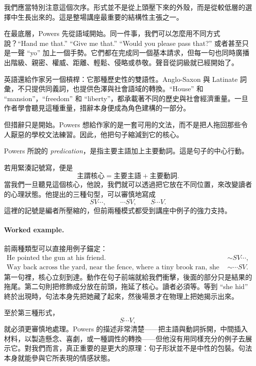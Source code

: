 我們應當特別注意這個次序。形式並不是從上頭壓下來的外殼，而是從較低層的選擇中生長出來的。這是整場講座最重要的結構性主張之一。

在最底層，Powers 先從語域開始。同一件事，我們可以怎麼用不同方式說？``Hand me that.'' ``Give me that.'' ``Would you please pass that?'' 或者甚至只是一聲 ``yo'' 加上一個手勢。它們都在完成同一個基本請求，但每一句也同時廣播出階級、親密、權威、距離、輕鬆、侵略或恭敬。聲音從詞級就已經開始了。

英語還給作家另一個槓桿：它那種歷史性的雙語性。Anglo-Saxon 與 Latinate 詞彙，不只提供同義詞，也提供色澤與社會語域的轉換。``House'' 和 ``mansion''，``freedom'' 和 ``liberty''，都承載著不同的歷史與社會經濟重量。一旦作者學會聽見這種重量，措辭本身便成為角色建構的一部分。

但措辭只是開始。Powers 想給作家的是一套可用的文法，而不是把人拖回那些令人厭惡的學校文法練習。因此，他把句子縮減到它的核心。

\begin{definition}
Powers 所說的 \emph{predication}，是指主要主語加上主要動詞。這是句子的中心行動。
\end{definition}

若用緊湊記號寫，便是
\begin{equation}
\text{主謂核心} = \text{主要主語} + \text{主要動詞}.
\end{equation}
當我們一旦聽見這個核心，他說，我們就可以透過把它放在不同位置，來改變讀者的心理狀態。他提出的三種句型，可以審慎地寫成
\begin{equation}
SV\cdots,\qquad \cdots SV,\qquad S\cdots V.
\end{equation}
這裡的記號是編者所壓縮的，但前兩種模式都受到講座中例子的強力支持。

\paragraph{Worked example.} 前兩種類型可以直接用例子錨定：
\begin{align}
\text{He pointed the gun at his friend.} &\sim SV\cdots,\\
\text{Way back across the yard, near the fence, where a tiny brook ran, she hid.} &\sim \cdots SV.
\end{align}
第一句裡，核心立刻到達。動作在句子前端就給我們衝擊，後面的部分只是結果的拖尾。第二句則把修飾成分放在前頭，拖延了核心。讀者必須等。等到 ``she hid'' 終於出現時，句法本身先把她藏了起來，然後場景才在物理上把她揭示出來。

至於第三種形式，
\[
S\cdots V,
\]
就必須更審慎地處理。Powers 的描述非常清楚——把主語與動詞拆開，中間插入材料，以製造懸念、喜劇，或一種調性的轉換——但他沒有用同樣充分的例子去展示它。對我們而言，真正重要的是更大的原理：句子形狀並不是中性的包裝。句法本身就能參與它所表現的情感狀態。

